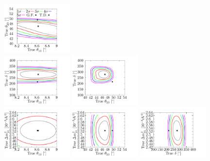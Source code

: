 \documentclass[a4paper,11pt]{article}
\begin{document}
\begin{figure}[!h]
 \flushleft
%
\includegraphics[width=0.32\textwidth]{figs/SR_th13_th23.pdf}$~~~~~~$\\
\includegraphics[width=0.32\textwidth]{figs/SR_th13_dCP.pdf}
\includegraphics[width=0.32\textwidth]{figs/SR_th23_dCP.pdf}$~~~~~~$\\
\includegraphics[width=0.32\textwidth]{figs/SR_th13_ldm.pdf}
\includegraphics[width=0.32\textwidth]{figs/SR_th23_ldm.pdf}
\includegraphics[width=0.32\textwidth]{figs/SR_dCP_ldm.pdf}

\end{figure}
\end{document}
